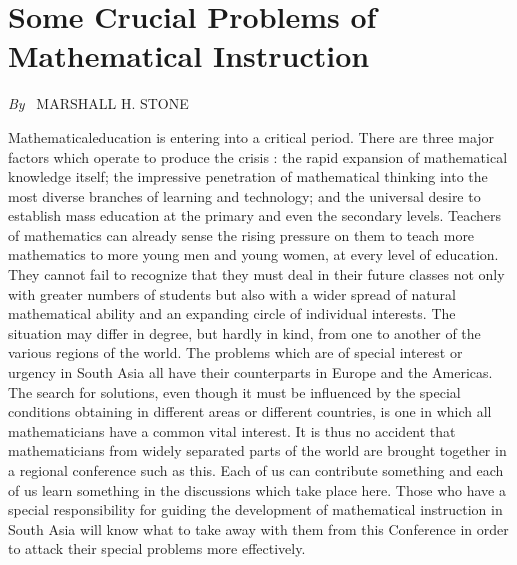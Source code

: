 \chapter{Some Crucial Problems of Mathematical Instruction}

\begin{center}
{\em By}~ MARSHALL H. STONE
\end{center}
\medskip

Mathematical\pageoriginale education is entering into a critical period. There are three major factors which operate to produce the crisis : the rapid expansion of mathematical knowledge itself; the impressive penetration of mathematical thinking into the most diverse branches of learning and technology; and the universal desire to establish mass education at the primary and even the secondary levels. Teachers of mathematics can already sense the rising pressure on them to teach more mathematics to more young men and young women, at every level of education. They cannot fail to recognize that they must deal in their future classes not only with greater numbers of students but also with a wider spread of natural mathematical ability and an expanding circle of individual interests. The situation may differ in degree, but hardly in kind, from one to another of the various regions of the world. The problems which are of special interest or urgency in South Asia all have their counterparts in Europe and the Americas. The search for solutions, even though it must be influenced by the special conditions obtaining in different areas or different countries, is one in which all mathematicians have a common vital interest. It is thus no accident that mathematicians from widely separated parts of the world are brought together in a regional conference such as this. Each of us can contribute something and each of us learn something in the discussions which take place here. Those who have a special responsibility for guiding the development of mathematical instruction in South Asia will know what to take away with them from this Conference in order to attack their special problems more effectively. 

